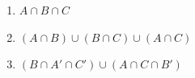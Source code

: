 \documentclass[12pt]{article}
\begin{document}
\begin{resultsbox}
\begin{enumerate}[label=(\roman*)]
    \item $A \cap B \cap C$
    \item $(A \cap B) \cup (B \cap C) \cup (A \cap C)$
    \item $(B \cap A' \cap C') \cup (A \cap C \cap B')$
\end{enumerate}
\end{resultsbox}


\end{document}
